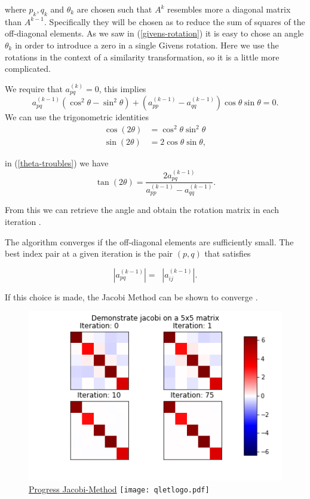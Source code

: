 \documentclass[12pt]{article}
\begin{document}
where $p_k, q_k$ and $\theta_k$ are chosen such that $A^{k}$ resembles more a diagonal matrix than $A^{k-1}$.  Specifically they will be chosen as to reduce the sum of squares of the off-diagonal elements. As we saw in (\ref{givens-rotation}) it is easy to chose an angle $\theta_k$ in order to introduce a zero in a single Givens rotation. Here we use the rotations in the context of a similarity transformation, so it is a little more complicated.

We require that $a_{pq}^{(k)} = 0$, this implies
\begin{equation}
\label{theta-troubles}
a^{(k-1)}_{pq} (\cos^2\theta - \sin^2\theta) + \left( a^{(k-1)}_{pp} - a^{(k-1)}_{qq} \right) \cos\theta \sin\theta = 0.
\end{equation}
We can use the trigonometric identities
\begin{align*}
\cos(2\theta) &= \cos^2 \theta \sin^2 \theta \\
\sin(2\theta) &= 2 \cos\theta \sin\theta,
\end{align*}

in (\ref{theta-troubles}) we have
$$\tan(2\theta) = \frac{2a^{(k-1)}_{pq}}{a^{(k-1)}_{pp} - a^{(k-1)}_{qq}}.$$

From this we can retrieve the angle and obtain the rotation matrix in each iteration \cite{NLA}.

The algorithm converges if the off-diagonal elements are sufficiently small. The best index pair at a given iteration is the pair $(p, q)$ that satisfies
 
\[
|a^{(k-1)}_{pq}| = \mathop{\max_{i<j}} |a^{(k-1)}_{ij}|.
\]

If this choice is made, the Jacobi Method can be shown to converge \cite{NLA}.

\begin{figure}
\begin{center}
\caption{\href {https://github.com/thsis/NIS18/tree/master/media/plots}{Progress Jacobi-Method}  \protect\texttt{[image: qletlogo.pdf]}}
  \label{j-plot}  
  \includegraphics[scale=0.6]{../media/plots/jacobi.png}
\end{center}
\end{figure}
\end{document}
